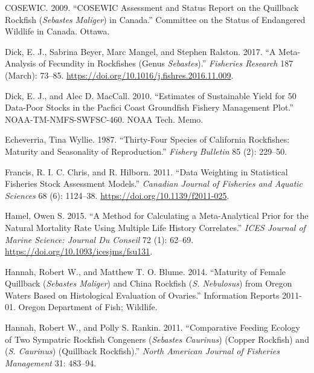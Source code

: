 \documentclass[11pt,
  english,
  a4paper,
]{article}
\begin{document}
\leavevmode\hypertarget{ref-Cosewic_2009}{}%
COSEWIC. 2009. ``COSEWIC Assessment and Status Report on the Quillback Rockfish (\emph{Sebastes Maliger}) in Canada.'' Committee on the Status of Endangered Wildlife in Canada. Ottawa.

\leavevmode\hypertarget{ref-dick_meta-analysis_2017}{}%
Dick, E. J., Sabrina Beyer, Marc Mangel, and Stephen Ralston. 2017. ``A Meta-Analysis of Fecundity in Rockfishes (Genus \emph{Sebastes}).'' \emph{Fisheries Research} 187 (March): 73--85. \url{https://doi.org/10.1016/j.fishres.2016.11.009}.

\leavevmode\hypertarget{ref-DickandMacCall_dbsra_2010}{}%
Dick, E. J., and Alec D. MacCall. 2010. ``Estimates of Sustainable Yield for 50 Data-Poor Stocks in the Pacfici Coast Groundfish Fishery Management Plot.'' NOAA-TM-NMFS-SWFSC-460. NOAA Tech. Memo.

\leavevmode\hypertarget{ref-Echeverria_maturity_1987}{}%
Echeverria, Tina Wyllie. 1987. ``Thirty-Four Species of California Rockfishes: Maturity and Seasonality of Reproduction.'' \emph{Fishery Bulletin} 85 (2): 229--50.

\leavevmode\hypertarget{ref-francis_data_2011}{}%
Francis, R. I. C. Chris, and R. Hilborn. 2011. ``Data Weighting in Statistical Fisheries Stock Assessment Models.'' \emph{Canadian Journal of Fisheries and Aquatic Sciences} 68 (6): 1124--38. \url{https://doi.org/10.1139/f2011-025}.

\leavevmode\hypertarget{ref-hamel_method_2015}{}%
Hamel, Owen S. 2015. ``A Method for Calculating a Meta-Analytical Prior for the Natural Mortality Rate Using Multiple Life History Correlates.'' \emph{ICES Journal of Marine Science: Journal Du Conseil} 72 (1): 62--69. \url{https://doi.org/10.1093/icesjms/fsu131}.

\leavevmode\hypertarget{ref-HannahandBlume_maturity_2011}{}%
Hannah, Robert W., and Matthew T. O. Blume. 2014. ``Maturity of Female Quillback (\emph{Sebastes Maliger}) and China Rockfish (\emph{S. Nebulosus}) from Oregon Waters Based on Histological Evaluation of Ovaries.'' Information Reports 2011-01. Oregon Department of Fish; Wildlife.

\leavevmode\hypertarget{ref-HannahandRankin_rockfish_site_fidelity_2011}{}%
Hannah, Robert W., and Polly S. Rankin. 2011. ``Comparative Feeding Ecology of Two Sympatric Rockfish Congeners (\emph{Sebastes Caurinus}) (Copper Rockfish) and (\emph{S. Caurinus}) (Quillback Rockfish).'' \emph{North American Journal of Fisheries Management} 31: 483--94.
\end{document}
